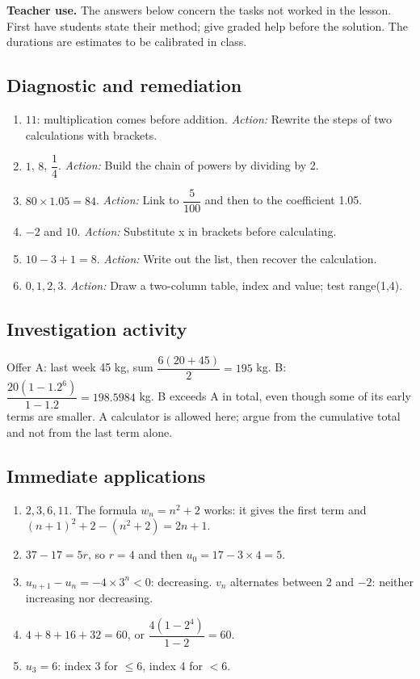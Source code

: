 \label{C01-CORR}
\textbf{Teacher use.} The answers below concern the tasks not worked in the lesson. First have students state their method; give graded help before the solution. The durations are estimates to be calibrated in class.
\subsection*{Diagnostic and remediation}
\begin{enumerate}
\item $11$: multiplication comes before addition. \textit{Action:} Rewrite the steps of two calculations with brackets.
\item $1$, $8$, $\dfrac{1}{4}$. \textit{Action:} Build the chain of powers by dividing by 2.
\item $80\times\num{1,05}=84$. \textit{Action:} Link  to $\dfrac{5}{100}$ and then to the coefficient \num{1,05}.
\item $-2$ and $10$. \textit{Action:} Substitute x in brackets before calculating.
\item $10-3+1=8$. \textit{Action:} Write out the list, then recover the calculation.
\item $0,1,2,3$. \textit{Action:} Draw a two-column table, index and value; test range(1,4).
\end{enumerate}
\subsection*{Investigation activity}
Offer A: last week 45 kg, sum $\dfrac{6(20+45)}{2}=195$ kg. B: $\dfrac{20(1-\num{1,2}^6)}{1-\num{1,2}}=\num{198,5984}$ kg. B exceeds A in total, even though some of its early terms are smaller. A calculator is allowed here; argue from the cumulative total and not from the last term alone.
\subsection*{Immediate applications}
\begin{enumerate}
\item $2,3,6,11$. The formula $w_n=n^2+2$ works: it gives the first term and $(n+1)^2+2-(n^2+2)=2n+1$.
\item $37-17=5r$, so $r=4$ and then $u_0=17-3\times4=5$.
\item $u_{n+1}-u_n=-4\times3^n<0$: decreasing. $v_n$ alternates between 2 and $-2$: neither increasing nor decreasing.
\item $4+8+16+32=60$, or $\dfrac{4(1-2^4)}{1-2}=60$.
\item $u_3=6$: index 3 for $\leq6$, index 4 for $<6$.
\end{enumerate}
